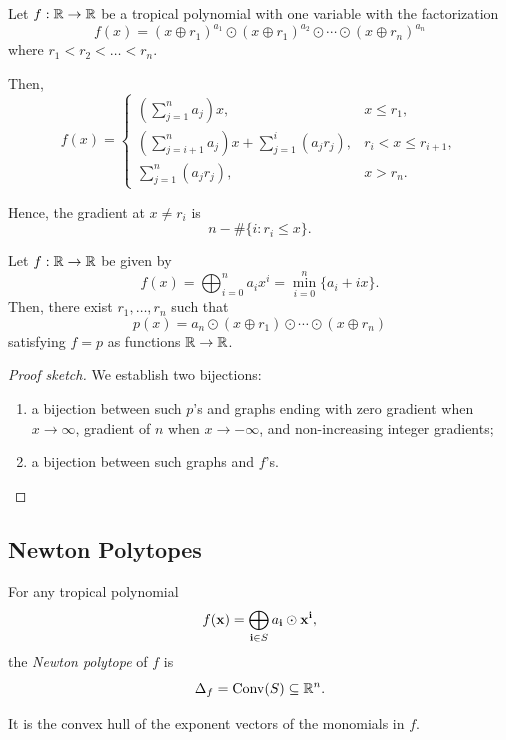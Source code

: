 \documentclass[../../main.tex]{subfiles}
\begin{document}
\begin{prop}
    Let $f:\mathbb{R} \to \mathbb{R}$ be a tropical polynomial with one variable with the factorization
    \[f(x)=(x\oplus r_1)^{a_1}\odot (x\oplus r_1)^{a_2}\odot\cdots \odot (x\oplus r_n)^{a_n}\]
    where $r_1<r_2<\dots<r_n$.

    Then,
    \[f(x)=\begin{cases}
        \left(\sum_{j=1}^n a_j\right)x, & x\le r_1,\\
        \left(\sum_{j=i+1}^n a_j\right)x+\sum_{j=1}^i (a_jr_j), & r_i<x\le r_{i+1},\\
        \sum_{j=1}^n (a_jr_j), & x>r_n.
    \end{cases}\]

    Hence, the gradient at $x\neq r_i$ is
    \[n-\#\{i:r_i\le x\}.\]
\end{prop}

\begin{thm}
    Let $f:\mathbb{R} \to \mathbb{R}$ be given by 
    \[f(x)=\bigoplus_{i=0}^n a_ix^i=\min_{i=0}^n\{a_i+ix\}.\]
    Then, there exist $r_1,\dots,r_n$ such that
    \[p(x)=a_n\odot(x\oplus r_1)\odot \cdots \odot (x\oplus r_n)\]
    satisfying $f=p$ as functions $\mathbb{R}\to \mathbb{R}$.
\end{thm}

\begin{proof}[Proof sketch]
    We establish two bijections:
    \begin{enumerate}[label=(\roman*)]
        \item a bijection between such $p$'s and graphs ending with zero gradient when $x \to \infty$, gradient of $n$ when $x \to -\infty$, and non-increasing integer gradients;

        \item a bijection between such graphs and $f$'s.
    \end{enumerate}
\end{proof}

\subsection{Newton Polytopes}

\begin{defin}
    For any tropical polynomial
    \[f(\mathbf{x})=\bigoplus_{\mathbf{i} \in S}a_{\mathbf{i}} \odot \mathbf{x}^{\mathbf{i}},\]
    the \textit{Newton polytope} of $f$ is
    \[\Delta_f=\operatorname{Conv} (S)\subseteq \mathbb{R}^n.\]
    
    It is the convex hull of the exponent vectors of the monomials in $f$.
\end{defin}
\end{document}
